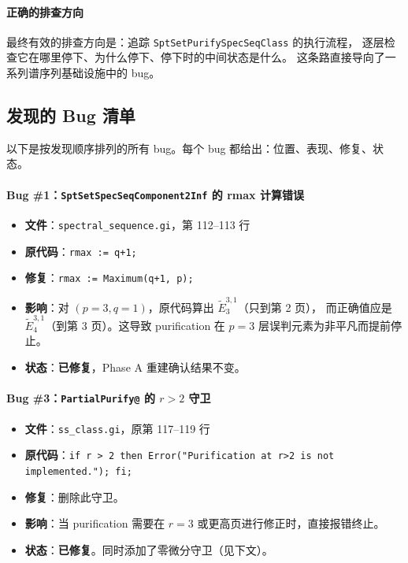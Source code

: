 \documentclass[a4paper,fontset=ubuntu,12pt]{ctexart}
\begin{document}
\paragraph{正确的排查方向}
最终有效的排查方向是：追踪 \texttt{SptSetPurifySpecSeqClass} 的执行流程，
逐层检查它在哪里停下、为什么停下、停下时的中间状态是什么。
这条路直接导向了一系列谱序列基础设施中的 bug。

\subsection{发现的 Bug 清单}
\label{sec:bug-list}

以下是按发现顺序排列的所有 bug。每个 bug 都给出：位置、表现、修复、状态。

\paragraph{Bug \#1：\texttt{SptSetSpecSeqComponent2Inf} 的 rmax 计算错误}
\begin{itemize}
\item \textbf{文件}：\texttt{spectral\_sequence.gi}，第 112--113 行
\item \textbf{原代码}：\texttt{rmax := q+1;}
\item \textbf{修复}：\texttt{rmax := Maximum(q+1, p);}
\item \textbf{影响}：对 $(p=3, q=1)$，原代码算出 $\tilde{E}_3^{3,1}$（只到第 2 页），
  而正确值应是 $\tilde{E}_4^{3,1}$（到第 3 页）。这导致 purification 在 $p=3$ 层误判元素为非平凡而提前停止。
\item \textbf{状态}：\textbf{已修复}，Phase A 重建确认结果不变。
\end{itemize}

\paragraph{Bug \#3：\texttt{PartialPurify@} 的 $r > 2$ 守卫}
\begin{itemize}
\item \textbf{文件}：\texttt{ss\_class.gi}，原第 117--119 行
\item \textbf{原代码}：\texttt{if r > 2 then Error("Purification at r>2 is not implemented."); fi;}
\item \textbf{修复}：删除此守卫。
\item \textbf{影响}：当 purification 需要在 $r=3$ 或更高页进行修正时，直接报错终止。
\item \textbf{状态}：\textbf{已修复}。同时添加了零微分守卫（见下文）。
\end{itemize}
\end{document}
